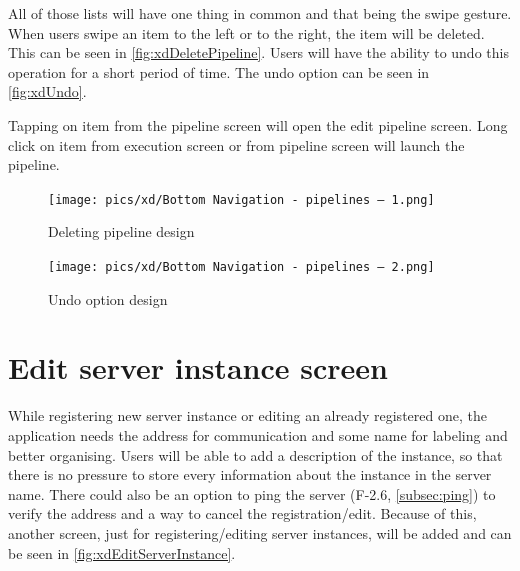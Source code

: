 All of those lists will have one thing in common and that being the swipe gesture.
When users swipe an item to the left or to the right, the item will be deleted.
This can be seen in \autoref{fig:xdDeletePipeline}.
Users will have the ability to undo this operation for a short period of time.
The undo option can be seen in \autoref{fig:xdUndo}.

Tapping on item from the pipeline screen will open the edit pipeline screen.
Long click on item from execution screen or from pipeline screen will launch the pipeline.

\begin{figure}\centering
    \begin{minipage}[b]{0.32\textwidth}
    	\texttt{[image: pics/xd/Bottom Navigation - pipelines – 1.png]}
    	\caption[Deleting pipeline]{Deleting pipeline design}\label{fig:xdDeletePipeline}
    \end{minipage}
    \begin{minipage}[b]{0.32\textwidth}
    	\texttt{[image: pics/xd/Bottom Navigation - pipelines – 2.png]}
    	\caption[Undo option]{Undo option design}\label{fig:xdUndo}
    \end{minipage}
\end{figure}

\section{Edit server instance screen}
While registering new server instance or editing an already registered one, the application needs the address for communication and some name for labeling and better organising.
Users will be able to add a description of the instance, so that there is no pressure to store every information about the instance in the server name.
There could also be an option to ping the server (F-2.6, \autoref{subsec:ping}) to verify the address and a way to cancel the registration/edit.
Because of this, another screen, just for registering/editing server instances, will be added and can be seen in \autoref{fig:xdEditServerInstance}.


